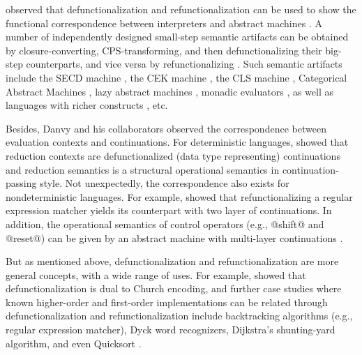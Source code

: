 \documentclass[acmsmall, review]{acmart}\settopmatter{}
\begin{document}
 observed that defunctionalization and refunctionalization
can be used to show the functional correspondence between interpreters and abstract machines
\cite{Ager:2003:FCE:888251.888254}. A number of independently designed small-step semantic artifacts can 
be obtained by closure-converting, CPS-transforming, and then defunctionalizing their big-step counterparts, 
and vice versa by refunctionalizing \cite{DANVY2009534}. 
Such semantic artifacts include the SECD machine \cite{10.1007/11431664_4, Ager:2003:FCE:888251.888254, DanvySECDJ},
the CEK machine \cite{Ager:2003:FCE:888251.888254}, the CLS machine  \cite{Ager:2003:FCE:888251.888254},
Categorical Abstract Machines \cite{Ager:2003:FCE:888251.888254}, lazy abstract machines \cite{AGER2004223}, 
monadic evaluators \cite{ager2005functional}, as well as languages with richer constructs
\cite{Danvy:2008:DIP:1411204.1411206, danvy2009towards, biernacka2009towards}, etc.

Besides, Danvy and his collaborators observed the correspondence between evaluation contexts and continuations.
For deterministic languages, \citet{Danvy:2008:DIP:1411204.1411206} showed that reduction contexts
are defunctionalized (data type representing) continuations and reduction semantics is a structural 
operational semantics in continuation-passing style.
Not unexpectedly, the correspondence also exists for nondeterministic languages. For example,
\citet{Danvy:2001:DW:773184.773202} showed that refunctionalizing a regular expression matcher yields
its counterpart with two layer of continuations.
In addition, the operational semantics of control operators (e.g., @shift@ and @reset@) can be given by an 
abstract machine with multi-layer continuations \cite{Danvy:1990:AC:91556.91622, lmcs:2269}. 

But as mentioned above, defunctionalization and refunctionalization are more general concepts, with a wide range of uses. For example, \citet{Danvy:2001:DW:773184.773202} showed that defunctionalization is dual to Church encoding, and further case studies where known
higher-order and first-order implementations can be related through defunctionalization
and refunctionalization include backtracking algorithms (e.g., regular expression matcher), Dyck word recognizers, Dijkstra's shunting-yard algorithm, and even Quicksort \cite{Danvy:2006:RW:2171265.2171268, 
DANVY2009534, Danvy:2001:DW:773184.773202}. \\

\end{document}
